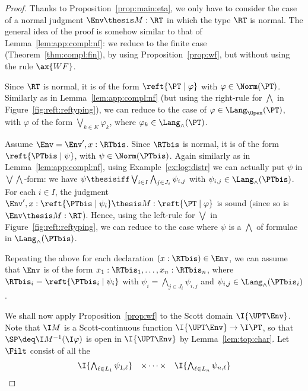 \begin{proof}
Thanks to Proposition~\ref{prop:main:eta},
we only have to consider the case of a normal judgment $\Env \thesis M : \RT$
in which the type $\RT$ is normal.
The general idea of the proof is somehow similar to that of
Lemma~\ref{lem:app:compl:nf}:
we reduce to the finite case (Theorem~\ref{thm:compl:fin}),
by using Proposition~\ref{prop:wf}, but without using the rule $\ax{WF}$.

Since $\RT$ is normal, it is of the form $\reft{\PT \mid \varphi}$
with $\varphi \in \Norm(\PT)$.
Similarly as in Lemma~\ref{lem:app:compl:nf}
(but using the right-rule for $\bigwedge$ in Figure~\ref{fig:reft:reftyping}),
we can reduce to the case of $\varphi \in \Lang_\Open(\PT)$,
with $\varphi$ of the form $\bigvee_{k \in K} \varphi_k$,
where $\varphi_k \in \Lang_\land(\PT)$.

Assume $\Env = \Env', x : \RTbis$.
Since $\RTbis$ is normal, it is of the form
$\reft{\PTbis \mid \psi}$, with $\psi \in \Norm(\PTbis)$.
Again similarly as in Lemma~\ref{lem:app:compl:nf},
using Example~\ref{ex:log:distr}
we can actually put $\psi$ in $\bigvee\bigwedge$-form:
we have
$\psi \thesisiff \bigvee_{i \in I} \bigwedge_{j \in J_i} \psi_{i,j}$
with $\psi_{i,j} \in \Lang_\land(\PTbis)$.
For each $i \in I$,
the judgment
$\Env', x : \reft{\PTbis \mid \psi_i} \thesis M : \reft{\PT \mid \varphi}$
is sound (since so is $\Env \thesis M : \RT$).
Hence, using the left-rule for $\bigvee$
in Figure~\ref{fig:reft:reftyping},
we can reduce to the case where $\psi$ is a $\bigwedge$
of formulae in $\Lang_\land(\PTbis)$.

Repeating the above for each declaration $(x:\RTbis) \in \Env$,
we can assume that $\Env$ is of the form
$x_1:\RTbis_1,\dots,x_n:\RTbis_n$,
where $\RTbis_i = \reft{\PTbis_i \mid \psi_i}$
with $\psi_i = \bigwedge_{j \in J_i} \psi_{i,j}$
and $\psi_{i,j} \in \Lang_\land(\PTbis_i)$.

We shall now apply Proposition~\ref{prop:wf}
to the Scott domain $\I{\UPT\Env}$.
Note that $\I M$ is a Scott-continuous function $\I{\UPT\Env} \to \I\PT$,
so that $\SP \deq \I M^{-1}(\I\varphi)$
is open in $\I{\UPT\Env}$ by Lemma~\ref{lem:top:char}.
Let $\Filt$ consist of all the
\[
\begin{array}{l l l}
  \I{\bigwedge_{\ell \in L_1} \psi_{1,\ell}}
& \times \dots \times
& \I{\bigwedge_{\ell \in L_n} \psi_{n,\ell}}
\end{array}
\]


\end{proof}
